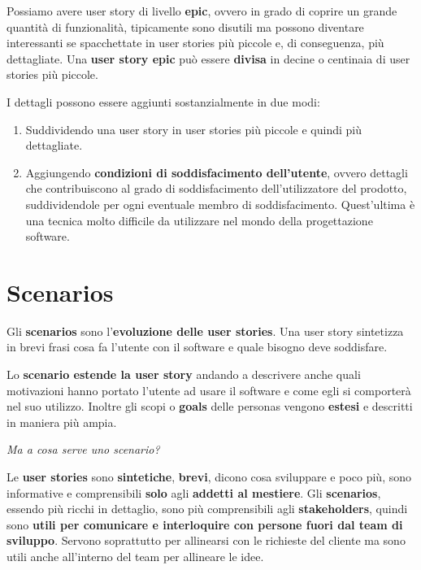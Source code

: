 Possiamo avere user story di livello \textbf{epic}, ovvero in grado di
coprire un grande quantità di funzionalità, tipicamente sono disutili ma possono diventare interessanti se spacchettate in user stories più piccole e, di conseguenza, più dettagliate. Una \textbf{user story epic} può essere \textbf{divisa} in decine o centinaia di user stories più piccole.

I dettagli possono essere aggiunti sostanzialmente in due modi:
\begin{enumerate}
	\item Suddividendo una user story in user stories più piccole e quindi più dettagliate.
	\item Aggiungendo \textbf{condizioni di soddisfacimento dell'utente}, ovvero  dettagli che contribuiscono al grado di soddisfacimento dell'utilizzatore del prodotto, suddividendole per ogni eventuale membro di soddisfacimento. Quest'ultima è una tecnica molto difficile da utilizzare nel mondo della progettazione software.
\end{enumerate}

\section{Scenarios}

Gli \textbf{scenarios} sono l'\textbf{evoluzione delle user stories}. Una user story sintetizza in brevi frasi cosa fa l'utente con il software e quale bisogno deve soddisfare.

Lo \textbf{scenario estende la user story} andando a descrivere anche quali motivazioni hanno portato l'utente ad usare il software e come egli si comporterà nel suo utilizzo. Inoltre gli scopi o \textbf{goals} delle personas vengono \textbf{estesi} e descritti in maniera più ampia.

\begin{flushleft}
	\textit{Ma a cosa serve uno scenario?}
\end{flushleft}

Le \textbf{user stories} sono \textbf{sintetiche}, \textbf{brevi}, dicono cosa sviluppare e poco più, sono informative e comprensibili \textbf{solo} agli \textbf{addetti al mestiere}. Gli \textbf{scenarios}, essendo più ricchi in dettaglio, sono più comprensibili agli \textbf{stakeholders}, quindi sono \textbf{utili per comunicare e interloquire con persone fuori dal team di sviluppo}. Servono soprattutto per allinearsi con le richieste del cliente ma sono  utili anche all'interno del team per allineare le idee.

